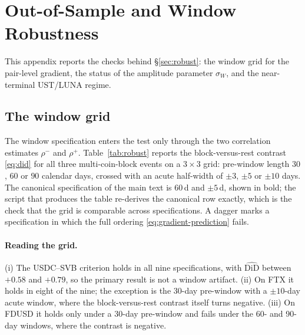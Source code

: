 \section{Out-of-Sample and Window Robustness}\label{app:oos}
This appendix reports the checks behind \S\ref{sec:robust}: the window grid for the pair-level gradient, the status of the amplitude parameter $\sigma_W$, and the near-terminal UST/LUNA regime.

\subsection{The window grid}\label{app:oos-grid}
The window specification enters the test only through the two correlation estimates $\rho^-$ and $\rho^+$. Table~\ref{tab:robust} reports the block-versus-rest contrast \eqref{eq:did} for all three multi-coin-block events on a $3\times3$ grid: pre-window length $30$, $60$ or $90$ calendar days, crossed with an acute half-width of $\pm3$, $\pm5$ or $\pm10$ days. The canonical specification of the main text is $60$\,d and $\pm5$\,d, shown in bold; the script that produces the table re-derives the canonical row exactly, which is the check that the grid is comparable across specifications. A dagger marks a specification in which the full ordering \eqref{eq:gradient-prediction} fails.

\begin{table}[!ht]
\centering
\caption{Window grid for the pair-level gradient. Entries are the block-versus-rest contrast $\widehat{\mathrm{DiD}}$ of \eqref{eq:did}. Bold marks the canonical specification used in the main text. $\dagger$ marks a specification under which the criterion \eqref{eq:gradient-prediction} does not hold. The grid varies only the correlation windows; block assignments are fixed ex ante and are not re-estimated at any specification.}
\label{tab:robust}

\end{table}

\paragraph{Reading the grid.} (i) The USDC--SVB criterion holds in all nine specifications, with $\widehat{\mathrm{DiD}}$ between $+0.58$ and $+0.79$, so the primary result is not a window artifact. (ii) On FTX it holds in eight of the nine; the exception is the 30-day pre-window with a $\pm10$-day acute window, where the block-versus-rest contrast itself turns negative. (iii) On FDUSD it holds only under a 30-day pre-window and fails under the 60- and 90-day windows, where the contrast is negative.


